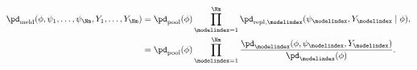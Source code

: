 \begin{equation}
\begin{aligned}
  \pd_{\text{meld}}(\phi, \psi_{1}, \ldots, \psi_{\Nm}, Y_{1}, \ldots, Y_{\Nm}) &= 
  \pd_{\text{pool}}(\phi) \prod_{\modelindex = 1}^{\Nm} \pd_{\text{repl}, \modelindex}(\psi_{\modelindex}, Y_{\modelindex} \mid \phi), \\ &= 
  \pd_{\text{pool}}(\phi) \prod_{\modelindex = 1}^{\Nm} \frac{
    \pd_{\modelindex}(\phi, \psi_{\modelindex}, Y_{\modelindex})
  } {
    \pd_{\modelindex}(\phi)
  }.
\end{aligned}
\end{equation}